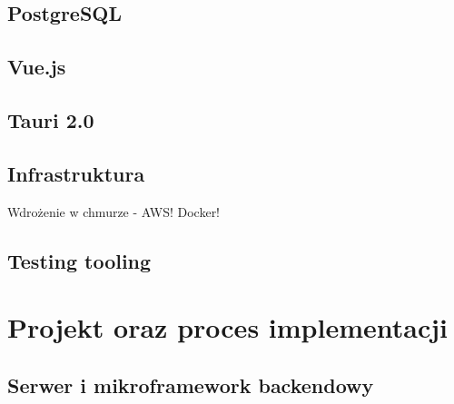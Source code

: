 \documentclass[12pt, a4paper]{article}
\begin{document}
\subsection{PostgreSQL}
\subsection{Vue.js}
\subsection{Tauri 2.0}
\subsection{Infrastruktura}
Wdrożenie w chmurze - AWS! Docker!
\subsection{Testing tooling}

\section{Projekt oraz proces implementacji}

\subsection{Serwer i mikroframework backendowy}
\end{document}
